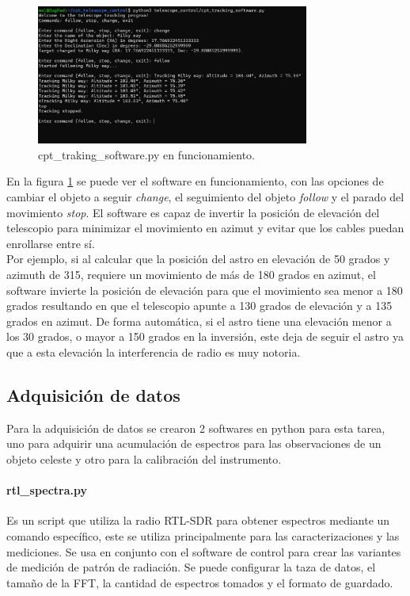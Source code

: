 \begin{figure}
    \centering
    \includegraphics[width=0.8\textwidth]{img/traking}
    \caption{cpt\_traking\_software.py en funcionamiento.}
    \label{fig:control}
\end{figure}

En la figura \ref{fig:control} se puede ver el software en funcionamiento, con las opciones de cambiar el objeto a seguir \textit{change}, el seguimiento del objeto \textit{follow} y el parado del movimiento \textit{stop}. El software es capaz de invertir la posición de elevación del telescopio para minimizar el movimiento en azimut y evitar que los cables puedan enrollarse entre sí.\\

Por ejemplo, si al calcular que la posición del astro en elevación de 50 grados y azimuth de 315, requiere un movimiento de más de 180 grados en azimut, el software invierte la posición de elevación para que el movimiento sea menor a 180 grados resultando en que el telescopio apunte a 130 grados de elevación y a 135 grados en azimut. De forma automática, si el astro tiene una elevación menor a los 30 grados, o mayor a 150 grados en la inversión, este deja de seguir el astro ya que a esta elevación la interferencia de radio es muy notoria.\\

\subsection{Adquisición de datos} 

Para la adquisición de datos se crearon 2 softwares en python para esta tarea, uno para adquirir una acumulación de espectros para las observaciones de un objeto celeste y otro para la calibración del instrumento.\\

\paragraph{rtl\_spectra.py} Es un script que utiliza la radio RTL-SDR para obtener espectros mediante un comando específico, este se utiliza principalmente para las caracterizaciones y las mediciones. Se usa en conjunto con el software de control para crear las variantes de medición de patrón de radiación. Se puede configurar la taza de datos, el tamaño de la FFT, la cantidad de espectros tomados y el formato de guardado.\\

